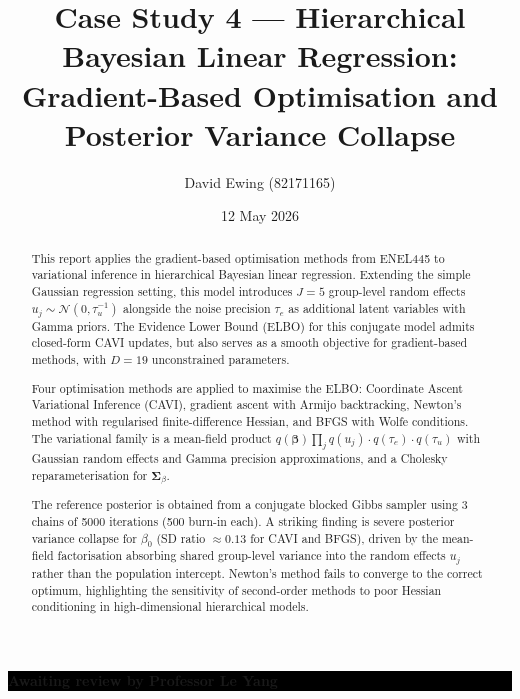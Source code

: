 \documentclass[11pt,a4paper]{article}
\title{
Case Study 4 --- Hierarchical Bayesian Linear Regression:\\[0.4em]
Gradient-Based Optimisation and Posterior Variance Collapse
}
\author{
  David Ewing (82171165)
}
\date{12 May 2026}
\begin{document}
\maketitle

\begin{abstract}
\setlength{\parindent}{0pt}
\setlength{\parskip}{0.7em}

This report applies the gradient-based optimisation methods from ENEL445 to variational
inference in hierarchical Bayesian linear regression.
Extending the simple Gaussian regression setting, this model introduces $J=5$ group-level
random effects $u_j \sim \mathcal{N}(0,\tau_u^{-1})$ alongside the noise precision
$\tau_e$ as additional latent variables with Gamma priors.
The Evidence Lower Bound (ELBO) for this conjugate model admits closed-form CAVI updates,
but also serves as a smooth objective for gradient-based methods, with $D=19$ unconstrained
parameters.

Four optimisation methods are applied to maximise the ELBO:
Coordinate Ascent Variational Inference (CAVI), gradient ascent with Armijo backtracking,
Newton's method with regularised finite-difference Hessian, and BFGS with Wolfe conditions.
The variational family is a mean-field product
$q(\bm{\beta})\prod_j q(u_j) \cdot q(\tau_e)\cdot q(\tau_u)$
with Gaussian random effects and Gamma precision approximations, and a
Cholesky reparameterisation for $\bm{\Sigma}_\beta$.

The reference posterior is obtained from a conjugate blocked Gibbs sampler
using 3 chains of 5000 iterations (500 burn-in each).
A striking finding is severe posterior variance collapse for $\beta_0$
(SD ratio $\approx 0.13$ for CAVI and BFGS), driven by the mean-field factorisation
absorbing shared group-level variance into the random effects $u_j$ rather than
the population intercept.
Newton's method fails to converge to the correct optimum, highlighting the
sensitivity of second-order methods to poor Hessian conditioning in high-dimensional
hierarchical models.
\end{abstract}

\vspace{2em}

\noindent\colorbox{black}{%
  \parbox{\dimexpr\linewidth-2\fboxsep}{%
    \centering
    \vspace{8pt}
    {\color{white}\large\bfseries Awaiting review by Professor Le Yang}%
    \vspace{8pt}
  }%
}
\end{document}
